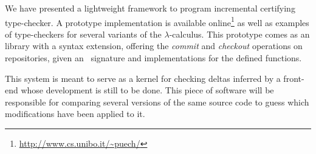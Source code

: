 \documentclass{llncs}
\begin{document}
We have presented a lightweight framework to program incremental
certifying type-checker. A prototype implementation is available
online\footnote{\url{http://www.cs.unibo.it/~puech/}} as well as
examples of type-checkers for several variants of the
$\lambda$-calculus. This prototype comes as an  library
with a  syntax extension, offering the \emph{commit}
and \emph{checkout} operations on repositories, given an \LF\
signature and  implementations for the defined
functions.

This system is meant to serve as a kernel for checking deltas inferred
by a front-end whose development is still to be done. This piece of
software will be responsible for comparing several versions of the same
source code to guess which modifications have been applied to it.













\end{document}
